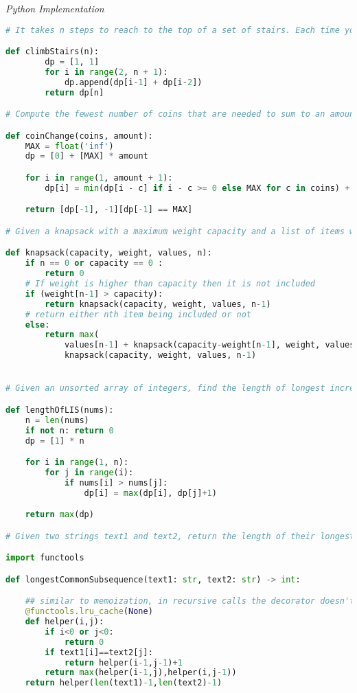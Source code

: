 \documentclass{article}
\begin{document}

\vspace{8pt} \emph{Python Implementation}
\begin{lstlisting}[language=Python]
# It takes n steps to reach to the top of a set of stairs. Each time you can either climb 1 or 2 steps. In how many distinct ways can you climb to the top?

def climbStairs(n):
        dp = [1, 1]
        for i in range(2, n + 1):
            dp.append(dp[i-1] + dp[i-2])
        return dp[n]

# Compute the fewest number of coins that are needed to sum to an amount

def coinChange(coins, amount):
    MAX = float('inf')
    dp = [0] + [MAX] * amount

    for i in range(1, amount + 1):
        dp[i] = min(dp[i - c] if i - c >= 0 else MAX for c in coins) + 1

    return [dp[-1], -1][dp[-1] == MAX]

# Given a knapsack with a maximum weight capacity and a list of items with value and weights, maximize the amount of value we can fit within the knapsacks weight capacity.

def knapsack(capacity, weight, values, n):
    if n == 0 or capacity == 0 :
        return 0
    # If weight is higher than capacity then it is not included
    if (weight[n-1] > capacity):
        return knapsack(capacity, weight, values, n-1)
    # return either nth item being included or not
    else:
        return max(
            values[n-1] + knapsack(capacity-weight[n-1], weight, values, n-1),
            knapsack(capacity, weight, values, n-1)


# Given an unsorted array of integers, find the length of longest increasing subsequence.

def lengthOfLIS(nums):
    n = len(nums)
    if not n: return 0
    dp = [1] * n

    for i in range(1, n):
        for j in range(i):
            if nums[i] > nums[j]:
                dp[i] = max(dp[i], dp[j]+1)

    return max(dp)

# Given two strings text1 and text2, return the length of their longest common subsequence.

import functools

def longestCommonSubsequence(text1: str, text2: str) -> int:

    ## similar to memoization, in recursive calls the decorator doesn't have to recompute but retrieves from the cache
    @functools.lru_cache(None)
    def helper(i,j):
        if i<0 or j<0:
            return 0
        if text1[i]==text2[j]:
            return helper(i-1,j-1)+1
        return max(helper(i-1,j),helper(i,j-1))
    return helper(len(text1)-1,len(text2)-1)

\end{lstlisting}
\end{document}
